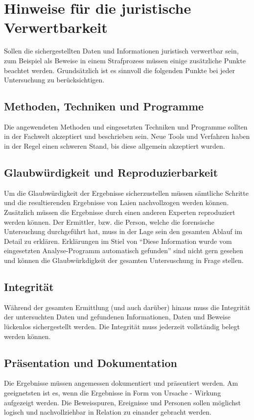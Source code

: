 \section{Hinweise für die juristische Verwertbarkeit}
Sollen die sichergestellten Daten und Informationen juristisch verwertbar sein, zum Beispiel als Beweise in einem Strafprozess müssen einige zusätzliche Punkte beachtet werden. Grundsätzlich ist es sinnvoll die folgenden Punkte bei jeder Untersuchung zu berücksichtigen.

\subsection{Methoden, Techniken und Programme}
Die angewendeten Methoden und eingesetzten Techniken und Programme sollten in der Fachwelt akzeptiert und beschrieben sein. Neue Tools und Verfahren haben in der Regel einen schweren Stand, bis diese allgemein akzeptiert wurden.

\subsection{Glaubwürdigkeit und Reproduzierbarkeit}
Um die Glaubwürdigkeit der Ergebnisse sicherzustellen müssen sämtliche Schritte und die resultierenden Ergebnisse von Laien nachvollzogen werden können. Zusätzlich müssen die Ergebnisse durch einen anderen Experten reproduziert werden können. Der Ermittler, bzw. die Person, welche die forensische Untersuchung durchgeführt hat, muss in der Lage sein den gesamten Ablauf im Detail zu erklären. Erklärungen im Stiel von "`Diese Information wurde vom eingesetzten Analyse-Programm automatisch gefunden"' sind nicht gern gesehen und können die Glaubwürkdigkeit der gesamten Untersuschung in Frage stellen.


\subsection{Integrität}
Während der gesamten Ermittlung (und auch darüber) hinaus muss die Integrität der untersuchten Daten und gefundenen Informationen, Daten und Beweise lückenlos sichergestellt werden. Die Integrität muss jederzeit vollständig belegt werden können.

\subsection{Präsentation und Dokumentation}
Die Ergebnisse müssen angemessen dokumentiert und präsentiert werden. Am geeignetsten ist es, wenn die Ergebnisse in Form von Ursache - Wirkung aufgezeigt werden. Die Beweisspuren, Ereignisse und Personen sollen möglichst logisch und nachvollziehbar in Relation zu einander gebracht werden.

